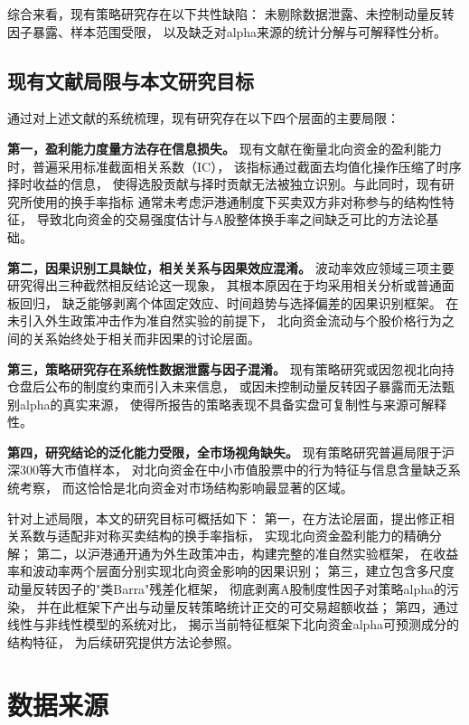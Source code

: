 \documentclass{article}
\begin{document}
综合来看，现有策略研究存在以下共性缺陷：
未剔除数据泄露、未控制动量反转因子暴露、样本范围受限，
以及缺乏对alpha来源的统计分解与可解释性分析。

\subsection{现有文献局限与本文研究目标}
\label{subsec:gap}

通过对上述文献的系统梳理，现有研究存在以下四个层面的主要局限：

\textbf{第一，盈利能力度量方法存在信息损失。}
现有文献在衡量北向资金的盈利能力时，普遍采用标准截面相关系数（IC），
该指标通过截面去均值化操作压缩了时序择时收益的信息，
使得选股贡献与择时贡献无法被独立识别。与此同时，现有研究所使用的换手率指标
通常未考虑沪港通制度下买卖双方非对称参与的结构性特征，
导致北向资金的交易强度估计与A股整体换手率之间缺乏可比的方法论基础。

\textbf{第二，因果识别工具缺位，相关关系与因果效应混淆。}
波动率效应领域三项主要研究得出三种截然相反结论这一现象，
其根本原因在于均采用相关分析或普通面板回归，
缺乏能够剥离个体固定效应、时间趋势与选择偏差的因果识别框架。
在未引入外生政策冲击作为准自然实验的前提下，
北向资金流动与个股价格行为之间的关系始终处于相关而非因果的讨论层面。

\textbf{第三，策略研究存在系统性数据泄露与因子混淆。}
现有策略研究或因忽视北向持仓盘后公布的制度约束而引入未来信息，
或因未控制动量反转因子暴露而无法甄别alpha的真实来源，
使得所报告的策略表现不具备实盘可复制性与来源可解释性。

\textbf{第四，研究结论的泛化能力受限，全市场视角缺失。}
现有策略研究普遍局限于沪深300等大市值样本，
对北向资金在中小市值股票中的行为特征与信息含量缺乏系统考察，
而这恰恰是北向资金对市场结构影响最显著的区域。

针对上述局限，本文的研究目标可概括如下：
第一，在方法论层面，提出修正相关系数与适配非对称买卖结构的换手率指标，
实现北向资金盈利能力的精确分解；
第二，以沪港通开通为外生政策冲击，构建完整的准自然实验框架，
在收益率和波动率两个层面分别实现北向资金影响的因果识别；
第三，建立包含多尺度动量反转因子的"类Barra"残差化框架，
彻底剥离A股制度性因子对策略alpha的污染，
并在此框架下产出与动量反转策略统计正交的可交易超额收益；
第四，通过线性与非线性模型的系统对比，
揭示当前特征框架下北向资金alpha可预测成分的结构特征，
为后续研究提供方法论参照。

\newpage
\section{数据来源}
\end{document}

